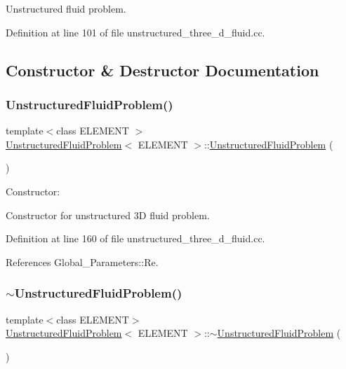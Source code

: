 Unstructured fluid problem. 

Definition at line 101 of file unstructured\+\_\+three\+\_\+d\+\_\+fluid.\+cc.



\subsection{Constructor \& Destructor Documentation}
\mbox{\label{classUnstructuredFluidProblem_a9751f4afac540e148b3d90ae43dd5187}} 
\subsubsection{\texorpdfstring{Unstructured\+Fluid\+Problem()}{UnstructuredFluidProblem()}}
{\footnotesize\ttfamily template$<$class E\+L\+E\+M\+E\+NT $>$ \\
\hyperlink{classUnstructuredFluidProblem}{Unstructured\+Fluid\+Problem}$<$ E\+L\+E\+M\+E\+NT $>$\+::\hyperlink{classUnstructuredFluidProblem}{Unstructured\+Fluid\+Problem} (\begin{DoxyParamCaption}{ }\end{DoxyParamCaption})}



Constructor\+: 

Constructor for unstructured 3D fluid problem. 

Definition at line 160 of file unstructured\+\_\+three\+\_\+d\+\_\+fluid.\+cc.



References Global\+\_\+\+Parameters\+::\+Re.

\mbox{\label{classUnstructuredFluidProblem_a4d660faa6bae35197a4ea73139ac9963}} 
\subsubsection{\texorpdfstring{$\sim$\+Unstructured\+Fluid\+Problem()}{~UnstructuredFluidProblem()}}
{\footnotesize\ttfamily template$<$class E\+L\+E\+M\+E\+NT$>$ \\
\hyperlink{classUnstructuredFluidProblem}{Unstructured\+Fluid\+Problem}$<$ E\+L\+E\+M\+E\+NT $>$\+::$\sim$\hyperlink{classUnstructuredFluidProblem}{Unstructured\+Fluid\+Problem} (\begin{DoxyParamCaption}{ }\end{DoxyParamCaption})\hspace{0.3cm}{\ttfamily [inline]}}



